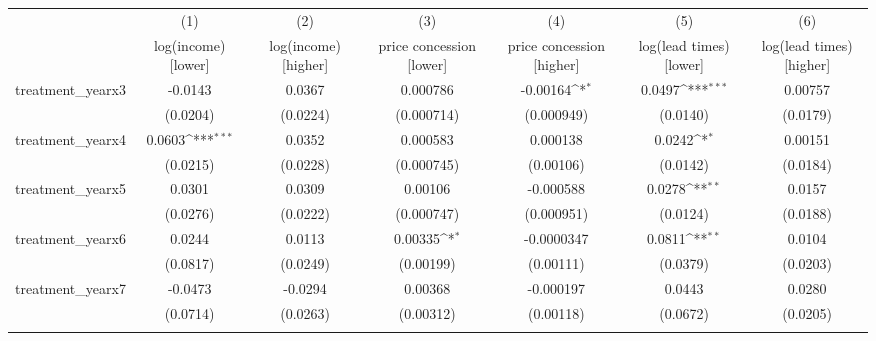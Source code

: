 {
\def\sym#1{\ifmmode^{#1}\else\(^{#1}\)\fi}
\begin{tabular}{l*{6}{c}}
\toprule
            &\multicolumn{1}{c}{(1)}&\multicolumn{1}{c}{(2)}&\multicolumn{1}{c}{(3)}&\multicolumn{1}{c}{(4)}&\multicolumn{1}{c}{(5)}&\multicolumn{1}{c}{(6)}\\
            &\multicolumn{1}{c}{log(income) [lower]}&\multicolumn{1}{c}{log(income) [higher]}&\multicolumn{1}{c}{price concession [lower]}&\multicolumn{1}{c}{price concession [higher]}&\multicolumn{1}{c}{log(lead times) [lower]}&\multicolumn{1}{c}{log(lead times) [higher]}\\
\midrule
treatment\_yearx3&     -0.0143         &      0.0367         &    0.000786         &    -0.00164\sym{*}  &      0.0497\sym{***}&     0.00757         \\
            &    (0.0204)         &    (0.0224)         &  (0.000714)         &  (0.000949)         &    (0.0140)         &    (0.0179)         \\
\addlinespace
treatment\_yearx4&      0.0603\sym{***}&      0.0352         &    0.000583         &    0.000138         &      0.0242\sym{*}  &     0.00151         \\
            &    (0.0215)         &    (0.0228)         &  (0.000745)         &   (0.00106)         &    (0.0142)         &    (0.0184)         \\
\addlinespace
treatment\_yearx5&      0.0301         &      0.0309         &     0.00106         &   -0.000588         &      0.0278\sym{**} &      0.0157         \\
            &    (0.0276)         &    (0.0222)         &  (0.000747)         &  (0.000951)         &    (0.0124)         &    (0.0188)         \\
\addlinespace
treatment\_yearx6&      0.0244         &      0.0113         &     0.00335\sym{*}  &  -0.0000347         &      0.0811\sym{**} &      0.0104         \\
            &    (0.0817)         &    (0.0249)         &   (0.00199)         &   (0.00111)         &    (0.0379)         &    (0.0203)         \\
\addlinespace
treatment\_yearx7&     -0.0473         &     -0.0294         &     0.00368         &   -0.000197         &      0.0443         &      0.0280         \\
            &    (0.0714)         &    (0.0263)         &   (0.00312)         &   (0.00118)         &    (0.0672)         &    (0.0205)         \\
\addlinespace

\end{tabular}}
